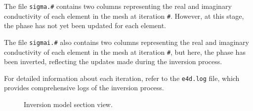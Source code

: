 \documentclass[a4paper,12pt]{article}
\begin{document}
The file \texttt{sigma.\#} contains two columns representing the real and
imaginary conductivity of each element in the mesh at iteration \texttt{\#}.
However, at this stage, the phase has not yet been updated for each element.

The file \texttt{sigmai.\#} also contains two columns representing the real and
imaginary conductivity of each element in the mesh at iteration \texttt{\#},
but here, the phase has been inverted, reflecting the updates made during the
inversion process.

For detailed information about each iteration, refer to the \texttt{e4d.log}
file, which provides comprehensive logs of the inversion process.

\begin{figure}[H]
    \centering
    \caption{Inversion model section view.}
    \label{fig:inversion}
\end{figure}



\end{document}
